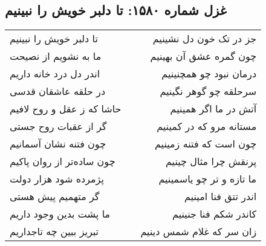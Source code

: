 \begin{center}
\section*{غزل شماره ۱۵۸۰: تا دلبر خویش را نبینیم}
\label{sec:1580}
\begin{longtable}{l p{0.5cm} r}
تا دلبر خویش را نبینیم
&&
جز در تک خون دل نشینیم
\\
ما به نشویم از نصیحت
&&
چون گمره عشق آن بهینیم
\\
اندر دل درد خانه داریم
&&
درمان نبود چو همچنینیم
\\
در حلقه عاشقان قدسی
&&
سرحلقه چو گوهر نگینیم
\\
حاشا که ز عقل و روح لافیم
&&
آتش در ما اگر همینیم
\\
گر از عقبات روح جستی
&&
مستانه مرو که در کمینیم
\\
چون فتنه نشان آسمانیم
&&
چون است که فتنه زمینیم
\\
چون ساده‌تر از روان پاکیم
&&
پرنقش چرا مثال چینیم
\\
پژمرده شود هزار دولت
&&
ما تازه و تر چو یاسمینیم
\\
گر متهمیم پیش هستی
&&
اندر تتق فنا امینیم
\\
ما پشت بدین وجود داریم
&&
کاندر شکم فنا جنینیم
\\
تبریز ببین چه تاجداریم
&&
زان سر که غلام شمس دینیم
\\
\end{longtable}
\end{center}

